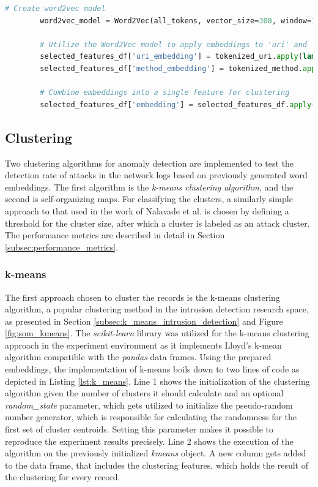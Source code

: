 \documentclass[
    fontsize=12pt,
    headings=small,
    parskip=half,           %
    bibliography=totoc,
    numbers=noenddot,       %
    open=any,               %
    ]{scrreprt}
\begin{document}
\begin{minipage}\linewidth
	\begin{lstlisting}[language={python}, caption={Creation of Word2Vec model and word embeddings}, label={lst:word2vec}] 
		# Create word2vec model
		word2vec_model = Word2Vec(all_tokens, vector_size=300, window=7, min_count=1, workers=4)
		
		# Utilize the Word2Vec model to apply embeddings to 'uri' and 'method' values
		selected_features_df['uri_embedding'] = tokenized_uri.apply(lambda x: sum(word2vec_model.wv[t] for t in x))
		selected_features_df['method_embedding'] = tokenized_method.apply(lambda x: sum(word2vec_model.wv[t] for t in x))
		
		# Combine embeddings into a single feature for clustering
		selected_features_df['embedding'] = selected_features_df.apply(lambda row: row['uri_embedding'] + row['method_embedding'], axis=1)
	\end{lstlisting}
\end{minipage}

\subsection{Clustering}
Two clustering algorithms for anomaly detection are implemented to test the detection rate of attacks in the network logs based on previously generated word embeddings. The first algorithm is the \emph{k-means clustering algorithm}, and the second is self-organizing maps. For classifying the clusters, a similarly simple approach to that used in the work of Nalavade et al. \cite{nalavade2014} is chosen by defining a threshold for the cluster size, after which a cluster is labeled as an attack cluster. The performance metrics are described in detail in Section \ref{subsec:performance_metrics}.

\subsubsection{k-means}
The first approach chosen to cluster the records is the k-means clustering algorithm, a popular clustering method in the intrusion detection research space, as presented in Section \ref{subsec:k_means_intrusion_detection} and Figure \ref{fig:som_kmeans}. The \emph{scikit-learn} \cite{scikitlearn2011} library was utilized for the k-means clustering approach in the experiment environment as it implements Lloyd's k-mean algorithm compatible with the \emph{pandas} data frames. Using the prepared embeddings, the implementation of k-means boils down to two lines of code as depicted in Listing \ref{lst:k_means}. Line 1 shows the initialization of the clustering algorithm given the number of clusters it should calculate and an optional \emph{random\_state} parameter, which gets utilized to initialize the pseudo-random number generator, which is responsible for calculating the randomness for the first set of cluster centroids. Setting this parameter makes it possible to reproduce the experiment results precisely. Line 2 shows the execution of the algorithm on the previously initialized \emph{kmeans} object. A new column gets added to the data frame, that includes the clustering features, which holds the result of the clustering for every record. 
\end{document}
